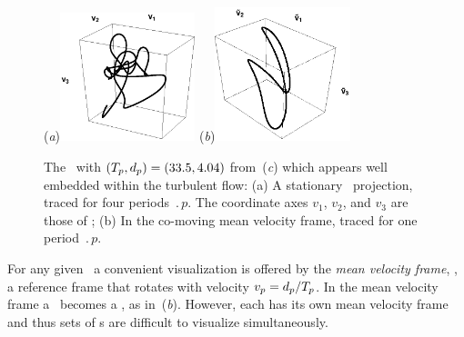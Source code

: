 \begin{figure}[h!t]
\begin{center}
(\textit{a})\includegraphics[width=0.35\textwidth]{../figs/ks22rpo033.50_04.045E2.eps}
(\textit{b})\includegraphics[width=0.35\textwidth]{../figs/ks22rpo033.50_04.045E2CM.eps}
\\
\end{center}
\caption[An \rpo\ in the  stationary, co-moving frames]{
 The \rpo\ with $({T_{p}},d_p) =(33.5,4.04)$
from \,(\textit{c})
which appears well embedded within the turbulent flow:
 (a) A stationary \statesp\ projection,
  traced for four periods $\period{p}$. The coordinate axes
$v_1$, $v_2$, and $v_3$ are those of ;
 (b) In the co-moving mean velocity frame,
 traced for one period $\period{p}$.
        } \label{f:MeanVelocityFrame}
\end{figure}

For any given \rpo\ a convenient visualization is
offered by the {\em mean velocity frame}, {\ie},
a reference frame that rotates with velocity
$v_p=d_p/{T_{p}}$.
In the mean velocity frame a \rpo\ becomes
a \po, as in \,(\textit{b}).
However, each {\rpo} has its own mean velocity frame and thus
sets of \rpo s are difficult to visualize simultaneously.
